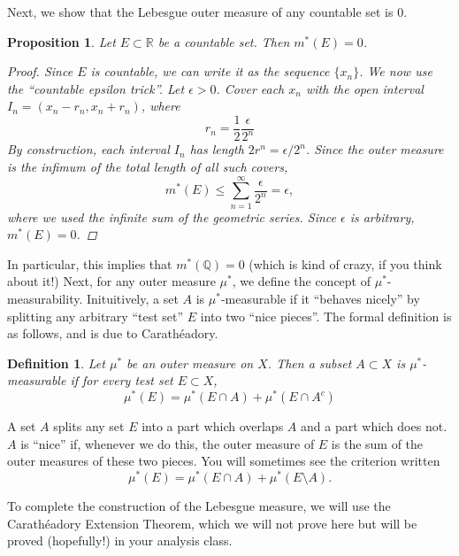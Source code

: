 \documentclass[12pt]{amsart}         %
\newtheorem{definition}{Definition}[section]
\newtheorem{proposition}{Proposition}[section]
\theoremstyle{remark}
\newcommand{\R}{\mathbb{R}}
\newcommand{\Q}{\mathbb{Q}}
\begin{document}
Next, we show that the Lebesgue outer measure of any countable set is 0.
\begin{proposition}
Let $E \subset \R$ be a countable set. Then $m^*(E) = 0$.
\begin{proof}
Since $E$ is countable, we can write it as the sequence $\{x_n\}$. We now use the ``countable epsilon trick''. Let $\epsilon > 0$. Cover each $x_n$ with the open interval $I_n = (x_n - r_n, x_n + r_n)$, where
\[
r_n = \frac{1}{2} \frac{\epsilon}{2^n}
\]
By construction, each interval $I_n$ has length $2 r^n = \epsilon/2^n$. Since the outer measure is the infimum of the total length of all such covers,
\[
m^*(E) \leq \sum_{n=1}^{\infty} \frac{\epsilon}{2^n} = \epsilon,
\]
where we used the infinite sum of the geometric series. Since $\epsilon$ is arbitrary, $m^*(E) = 0$.
\end{proof}
\end{proposition}

In particular, this implies that $m^*(\Q) = 0$ (which is kind of crazy, if you think about it!) Next, for any outer measure $\mu^*$, we define the concept of $\mu^*$-measurability. Inituitively, a set $A$ is $\mu^*$-measurable if it ``behaves nicely'' by splitting any arbitrary ``test set'' $E$ into two ``nice pieces''. The formal definition is as follows, and is due to Carath\'{e}adory.

\begin{definition}
Let $\mu^*$ be an outer measure on $X$. Then a subset $A \subset X$ is \emph{$\mu^*$-measurable} if for every test set $E \subset X$,
\[
\mu^*(E) = \mu^*(E \cap A) + \mu^*(E \cap A^c)
\]
\end{definition}

A set $A$ splits any set $E$ into a part which overlaps $A$ and a part which does not. $A$ is ``nice'' if, whenever we do this, the outer measure of $E$ is the sum of the outer measures of these two pieces. You will sometimes see the criterion written
\[
\mu^*(E) = \mu^*(E \cap A) + \mu^*(E \setminus A).
\]

To complete the construction of the Lebesgue measure, we will use the Carath\'{e}adory Extension Theorem, which we will not prove here but will be proved (hopefully!) in your analysis class.
\end{document}
